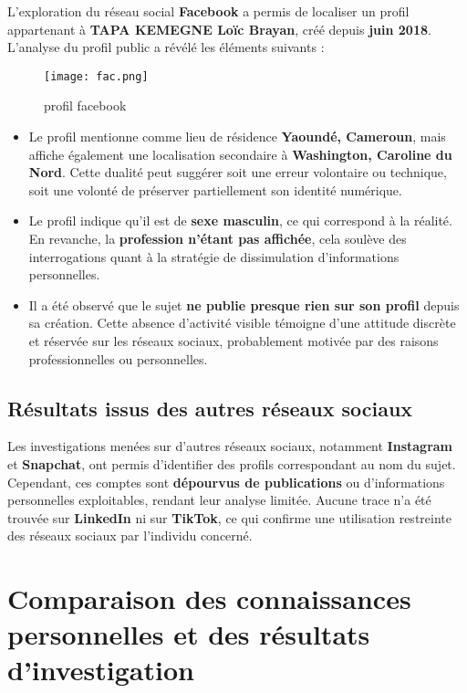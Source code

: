 \documentclass[12pt, a4em]{article}
\begin{document}
	L’exploration du réseau social \textbf{Facebook} a permis de localiser un profil appartenant à \textbf{TAPA KEMEGNE Loïc Brayan}, créé depuis \textbf{juin 2018}. 
	L’analyse du profil public a révélé les éléments suivants :
	
	\begin{figure}[h]
		\centering
		\texttt{[image: fac.png]}
		\caption{profil facebook}
	\end{figure}
	
	\begin{itemize}
		\item Le profil mentionne comme lieu de résidence \textbf{Yaoundé, Cameroun}, mais affiche également une localisation secondaire à \textbf{Washington, Caroline du Nord}. Cette dualité peut suggérer soit une erreur volontaire ou technique, soit une volonté de préserver partiellement son identité numérique.
		\item Le profil indique qu’il est de \textbf{sexe masculin}, ce qui correspond à la réalité. En revanche, la \textbf{profession n'étant pas affichée}, cela soulève des interrogations quant à la stratégie de dissimulation d’informations personnelles.
		\item Il a été observé que le sujet \textbf{ne publie presque rien sur son profil} depuis sa création. Cette absence d’activité visible témoigne d’une attitude discrète et réservée sur les réseaux sociaux, probablement motivée par des raisons professionnelles ou personnelles.
	\end{itemize}
	
	\subsection{Résultats issus des autres réseaux sociaux}
	
	Les investigations menées sur d’autres réseaux sociaux, notamment \textbf{Instagram} et \textbf{Snapchat}, ont permis d’identifier des profils correspondant au nom du sujet. 
	Cependant, ces comptes sont \textbf{dépourvus de publications} ou d’informations personnelles exploitables, rendant leur analyse limitée. 
	Aucune trace n’a été trouvée sur \textbf{LinkedIn} ni sur \textbf{TikTok}, ce qui confirme une utilisation restreinte des réseaux sociaux par l’individu concerné.
	
	\section{Comparaison des connaissances personnelles et des résultats d’investigation}
	
\end{document}
